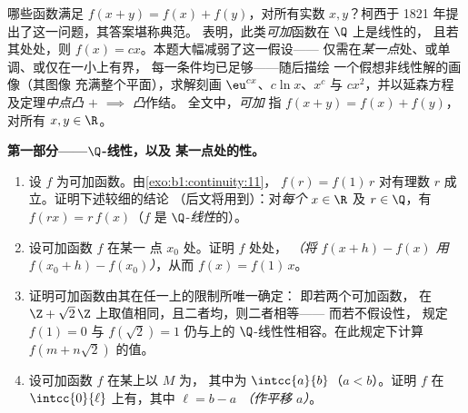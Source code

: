 \begin{problem}[{周末问题——$f(x + y) = f(x) + f(y)$：
正则性导出线性，以及“怪物”的画像}]
\label{pb:b1:continuity:1}
哪些函数满足 $f(x + y) = f(x) + f(y)$，对所有实数 $x,
y$？柯西于 1821 年提出了这一问题，其答案堪称典范。
 表明，此类\emph{可加}函数在 $\Q$ 上是线性的，
且若其处处，则 $f(x)
= cx$。本题大幅减弱了这一假设——
仅需在\emph{某一点}处、或单调、或仅在一小上有界，
每一条件均已足够——随后描绘
一个假想非线性解的画像（其图像
充满整个平面），求解刻画
$\eu^{cx}$、$c\ln x$、$x^c$ 与 $cx^2$，并以延森方程
及定理\emph{中点凸 $+$ 
$\implies$ 凸}作结。
全文中，\emph{可加}
指 $f(x + y) = f(x) + f(y)$，对所有 $x, y \in \R$。

\medskip
\noindent\textbf{第一部分——$\Q$-线性，以及
某一点处的性。}
\begin{enumerate}
  \item 设 $f$ 为可加函数。由\cref{exo:b1:continuity:11}，
        $f(r) = f(1)\,r$ 对有理数 $r$ 成立。证明下述较细的结论
        （后文将用到）：对\emph{每个} $x \in \R$ 及 $r
        \in \Q$，有 $f(rx) = r\,f(x)$（$f$ 是
        $\Q$-\emph{线性}的）。
  \item 设可加函数 $f$ 在某一
        点 $x_0$ 处。证明 $f$ 处处，
        \emph{（将 $f(x + h) - f(x)$ 用 $f(x_0 + h)
        - f(x_0)$）}，从而 $f(x) = f(1)\,x$。
  \item 证明可加函数由其在任一上的限制所唯一确定：
        即若两个可加函数，
        在 $\Z + \sqrt2\,\Z$ 上取值相同，且二者均，则二者相等——
        而若不假设性，
        规定 $f(1) = 0$ 与 $f(\sqrt 2) = 1$ 仍与上的
        $\Q$-线性性相容。在此规定下计算 $f(m +
        n\sqrt2)$ 的值。
  \item 设可加函数 $f$ 在某上以 $M$ 为，
        其中为 $\intcc{a}{b}$（$a < b$）。证明 $f$ 在
        $\intcc{0}{\ell}$ 上有，其中 $\ell = b - a$
        \emph{（作平移 $a$）}。
\end{enumerate}


\end{problem}
